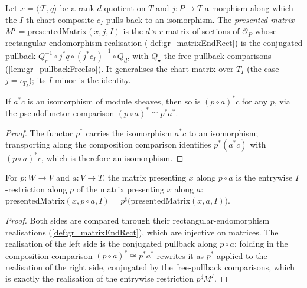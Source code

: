\begin{definition}\leanok
  \label{def:gr_presentedMatrix}
  Let \(x = \langle \mathcal{F}, q\rangle\) be a rank-\(d\) quotient on \(T\) and \(j : P \to
  T\) a morphism along which the \(I\)-th chart composite \(c_I\) pulls back to an isomorphism.
  The \emph{presented matrix} \(M^I = \mathrm{presentedMatrix}(x, j, I)\) is the \(d\times r\)
  matrix of sections of \(\mathcal{O}_P\) whose rectangular-endomorphism realisation
  (\cref{def:gr_matrixEndRect}) is the conjugated pullback
  \(Q_r^{-1}\circ j^{*}q \circ (j^{*}c_I)^{-1}\circ Q_d\), with \(Q_\bullet\) the free-pullback
  comparisons (\cref{lem:gr_pullbackFreeIso}). It generalises the chart matrix over \(T_I\)
  (the case \(j = \iota_{T_I}\)); its \(I\)-minor is the identity.
\end{definition}

\begin{lemma}\leanok
  \label{lem:gr_isIso_pullback_map_comp}
  If \(a^{*}c\) is an isomorphism of module sheaves, then so is \((p\circ a)^{*}c\) for any
  \(p\), via the pseudofunctor comparison \((p\circ a)^{*}\cong p^{*}a^{*}\).
\end{lemma}
\begin{proof}

  The functor \(p^{*}\) carries the isomorphism \(a^{*}c\) to an isomorphism; transporting
  along the composition comparison identifies \(p^{*}(a^{*}c)\) with \((p\circ a)^{*}c\),
  which is therefore an isomorphism.
\end{proof}

\begin{lemma}\leanok
  \label{lem:gr_presentedMatrix_comp}
  For \(p : W \to V\) and \(a : V \to T\), the matrix presenting \(x\) along \(p\circ a\) is
  the entrywise \(\Gamma\)-restriction along \(p\) of the matrix presenting \(x\) along \(a\):
  \(\mathrm{presentedMatrix}(x, p\circ a, I) = p^{\sharp}\bigl(\mathrm{presentedMatrix}(x,
  a, I)\bigr)\).
\end{lemma}
\begin{proof}
  Both sides are compared through their rectangular-endomorphism realisations
  (\cref{def:gr_matrixEndRect}), which are injective on matrices. The realisation of the left
  side is the conjugated pullback along \(p\circ a\); folding in the composition comparison
  \((p\circ a)^{*}\cong p^{*}a^{*}\) rewrites it as \(p^{*}\) applied to the realisation of the
  right side, conjugated by the free-pullback comparisons, which is exactly the realisation of
  the entrywise restriction \(p^{\sharp}M^I\).
\end{proof}

